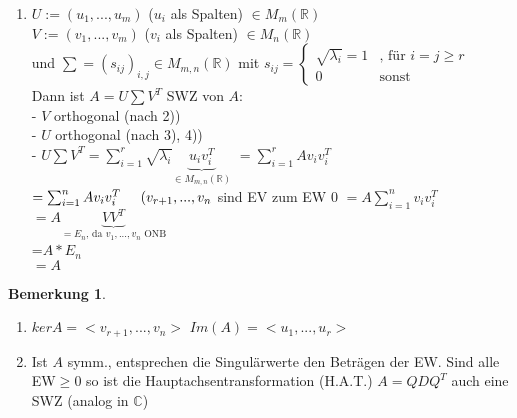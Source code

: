 \documentclass[a4paper,11pt]{article}
\newtheorem{bem}[definition]{Bemerkung}
\newcommand{\hsp}{\hspace{5mm}}
\begin{document}
\begin{enumerate}[label=\arabic*)]
	\item $U:=(u_1,...,u_m)$ ($u_i$ als Spalten) $\in M_m(\mathbb{R})$ \\
	$V:=(v_1,...,v_m)$ ($v_i$ als Spalten) $\in M_n(\mathbb{R})$ \\
	und $\sum=(s_{ij})_{i,j}\in M_{m,n}(\mathbb{R})$ mit $s_{ij}=\left\{\begin{array}{ll}\sqrt{\lambda_i}=1&\text{, für }i=j\geq r \\ 0 & \text{sonst}\end{array}\right.$ \\
	Dann ist $A=U\sum V^T$ SWZ von $A$: \\
	- $V$ orthogonal (nach 2)) \\
	- $U$ orthogonal (nach 3), 4)) \\
	- $U\sum V^T=\sum_{i=1}^r\sqrt{\lambda_i}\underbrace{u_iv_i^T}_{\in M_{m,n}(\mathbb{R})}$
	$=\sum^r_{i=1}Av_iv_i^T$ \\
	$=\sum^n_{i=1}Av_iv_i^T \hsp(v_{r+1},...,v_n$ sind EV zum EW 0
	$=A\sum^n_{i=1}v_iv_i^T$ \\
	$=A\underbrace{VV^T}_{=E_n\text{, da }v_1,...,v_n\text{ ONB}}$ \\
	=$A*E_n$ \\
	$=A$
\end{enumerate}

\begin{bem}
\end{bem}
\begin{enumerate}[label=\alph*)]
	\item $kerA=<v_{r+1},...,v_n>$ $Im(A)=<u_1,...,u_r>$
	\item Ist $A$ symm., entsprechen die Singulärwerte den Beträgen der EW. Sind alle EW$\geq$0 so ist die Hauptachsentransformation (H.A.T.) $A=QDQ^T$ auch eine SWZ (analog in $\mathbb{C}$)
\end{enumerate}
\end{document}
